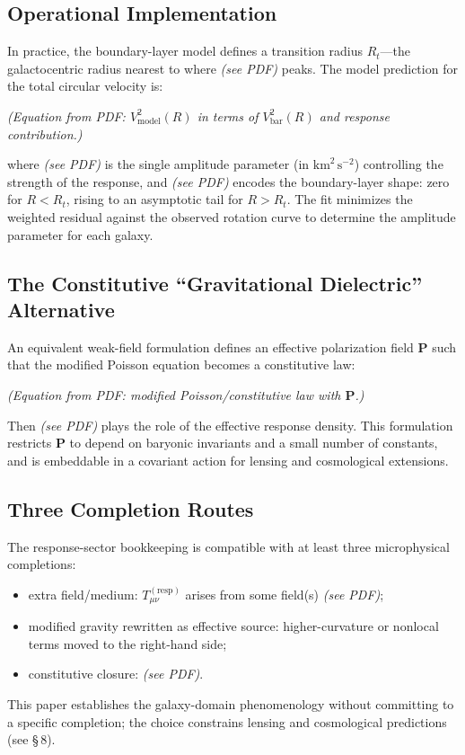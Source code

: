 \subsection{Operational Implementation}
In practice, the boundary-layer model defines a transition radius $R_t$---the galactocentric radius nearest to where \emph{(see PDF)} peaks. The model prediction for the total circular velocity is:

\emph{(Equation from PDF: $V_{\mathrm{model}}^2(R)$ in terms of $V_{\mathrm{bar}}^2(R)$ and response contribution.)}

where \emph{(see PDF)} is the single amplitude parameter (in $\mathrm{km}^2\,\mathrm{s}^{-2}$) controlling the strength of the response, and \emph{(see PDF)} encodes the boundary-layer shape: zero for $R < R_t$, rising to an asymptotic tail for $R > R_t$. The fit minimizes the weighted residual against the observed rotation curve to determine the amplitude parameter for each galaxy.

\subsection{The Constitutive “Gravitational Dielectric” Alternative}
An equivalent weak-field formulation defines an effective polarization field $\bm{P}$ such that the modified Poisson equation becomes a constitutive law:

\emph{(Equation from PDF: modified Poisson/constitutive law with $\bm{P}$.)}

Then \emph{(see PDF)} plays the role of the effective response density. This formulation restricts $\bm{P}$ to depend on baryonic invariants and a small number of constants, and is embeddable in a covariant action for lensing and cosmological extensions.

\subsection{Three Completion Routes}
The response-sector bookkeeping is compatible with at least three microphysical completions:

\begin{itemize}
\item extra field/medium: $T^{(\mathrm{resp})}_{\mu\nu}$ arises from some field(s) \emph{(see PDF)};
\item modified gravity rewritten as effective source: higher-curvature or nonlocal terms moved to the right-hand side;
\item constitutive closure: \emph{(see PDF)}.
\end{itemize}

This paper establishes the galaxy-domain phenomenology without committing to a specific completion; the choice constrains lensing and cosmological predictions (see \S\,8).
